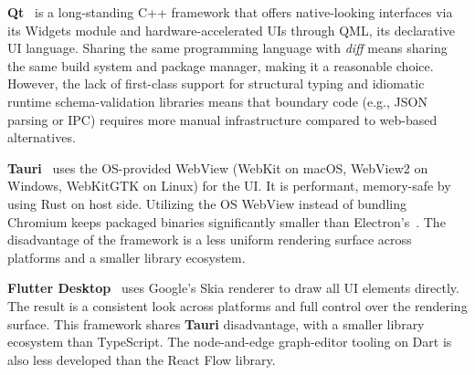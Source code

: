 \textbf{Qt}~\cite{qt} is a long-standing C++ framework that offers native-looking interfaces via its Widgets module and hardware-accelerated UIs through QML, its declarative UI language. Sharing the same programming language with \textit{diff} means sharing the same build system and package manager, making it a reasonable choice. However, the lack of first-class support for structural typing and idiomatic runtime schema-validation libraries means that boundary code (e.g., JSON parsing or IPC) requires more manual infrastructure compared to web-based alternatives.

\textbf{Tauri}~\cite{tauri} uses the OS-provided WebView (WebKit on macOS, WebView2 on Windows, WebKitGTK on Linux) for the UI. It is performant, memory-safe by using Rust on host side. Utilizing the OS WebView instead of bundling Chromium keeps packaged binaries significantly smaller than Electron's~\cite{tauribenchmarks}. The disadvantage of the framework is a less uniform rendering surface across platforms and a smaller library ecosystem.

\textbf{Flutter Desktop}~\cite{flutter} uses Google's Skia renderer to draw all UI elements directly. The result is a consistent look across platforms and full control over the rendering surface. This framework shares \textbf{Tauri} disadvantage, with a smaller library ecosystem than TypeScript. The node-and-edge graph-editor tooling on Dart is also less developed than the React Flow library.
